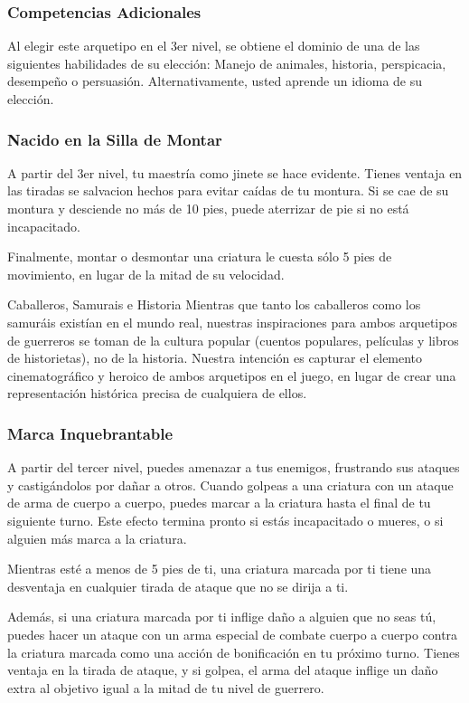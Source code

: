 \documentclass[a4paper,twocolumn,openany,10pt]{dndbook}
\begin{document}
\subsubsection{Competencias Adicionales}
Al elegir este arquetipo en el 3er nivel, se obtiene el dominio de una de las siguientes habilidades de su elección: Manejo de
animales, historia, perspicacia, desempeño o persuasión. Alternativamente, usted aprende un idioma de su elección. 

\subsubsection{Nacido en la Silla de Montar}
A partir del 3er nivel, tu maestría como jinete se hace evidente. Tienes ventaja en las tiradas se salvacion hechos para evitar
caídas de tu montura. Si se cae de su montura y desciende no más de 10 pies, puede aterrizar de pie si no está incapacitado.

Finalmente, montar o desmontar una criatura le cuesta sólo 5 pies de movimiento, en lugar de la mitad de su velocidad. 

\begin{paperbox}[float=!t]{Caballeros, Samurais e Historia}
Mientras que tanto los caballeros como los samuráis existían en el mundo real, nuestras inspiraciones para ambos arquetipos de
guerreros se toman de la cultura popular (cuentos populares, películas y libros de historietas), no de la historia. Nuestra
intención es capturar el elemento cinematográfico y heroico de ambos arquetipos en el juego, en lugar de crear una
representación histórica precisa de cualquiera de ellos. 
\end{paperbox}

\subsubsection{Marca Inquebrantable}
A partir del tercer nivel, puedes amenazar a tus enemigos, frustrando sus ataques y castigándolos por dañar a otros. Cuando
golpeas a una criatura con un ataque de arma de cuerpo a cuerpo, puedes marcar a la criatura hasta el final de tu siguiente
turno. Este efecto termina pronto si estás incapacitado o mueres, o si alguien más marca a la criatura.

Mientras esté a menos de 5 pies de ti, una criatura marcada por ti tiene una desventaja en cualquier tirada de ataque que no se
dirija a ti.

Además, si una criatura marcada por ti inflige daño a alguien que no seas tú, puedes hacer un ataque con un arma especial de
combate cuerpo a cuerpo contra la criatura marcada como una acción de bonificación en tu próximo turno. Tienes ventaja en la
tirada de ataque, y si golpea, el arma del ataque inflige un daño extra al objetivo igual a la mitad de tu nivel de guerrero.
\end{document}
